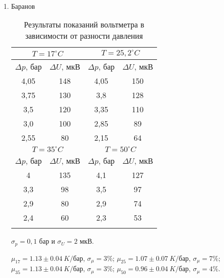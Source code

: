 \documentclass[a4paper, 12pt]{article}
\begin{document}
\newpage ~ \newpage
    \begin{enumerate}
        \item Баранов
        \begin{table}[ht!]
            \begin{tabular}{|c|c||c|c|}
            \hline
            \multicolumn{2}{|c||}{$T = 17 ^\circ C$} & \multicolumn{2}{|c|}{$T = 25,2 ^\circ C$} \\ \hline
            $\Delta p$, бар & $\Delta U$, мкВ & $\Delta p$, бар & $\Delta U$, мкВ \\ \hline
            4,05 & 148 & 4,05 & 150 \\ \hline
            3,75 & 130 & 3,8  & 128 \\ \hline
            3,5  & 120 & 3,35 & 110 \\ \hline
            3,0  & 100 & 2,85 & 89 \\ \hline
            2,55 & 80  & 2,15 & 64 \\ \hline \hline
            \multicolumn{2}{|c||}{$T = 35 ^\circ C$} & \multicolumn{2}{|c|}{$T = 50 ^\circ C$} \\ \hline 
            $\Delta p$, бар & $\Delta U$, мкВ & $\Delta p$, бар & $\Delta U$, мкВ \\ \hline
            4   & 135 & 4,1 & 127 \\ \hline
            3,3 & 98  & 3,5 & 97 \\ \hline
            2,9 & 80  & 2,9 & 74 \\ \hline
            2,4 & 60  & 2,3 & 53 \\ \hline
            \label{results}
            \end{tabular}
            \caption {Результаты показаний вольтметра в зависимости от разности давления}
        \end{table}

        $\sigma_p=0,1$ бар и 
        $\sigma_U=2$ мкВ.
        \begin{center}
            $\displaystyle \mu_{17} = 1.13 \pm 0.04\  K/$бар, $\displaystyle \sigma_{\mu} = 3\%$;\break
            $\displaystyle \mu_{25} = 1.07 \pm 0.07\  K/$бар, $\displaystyle \sigma_{\mu} = 7\%$;\break
            $\displaystyle \mu_{35} = 1.13 \pm 0.04\  K/$бар, $\displaystyle \sigma_{\mu} = 3\%$;\break
            $\displaystyle \mu_{50} = 0.96 \pm 0.04\  K/$бар, $\displaystyle \sigma_{\mu} = 4\%$.\break
        \end{center}


\end{enumerate}
\end{document}
